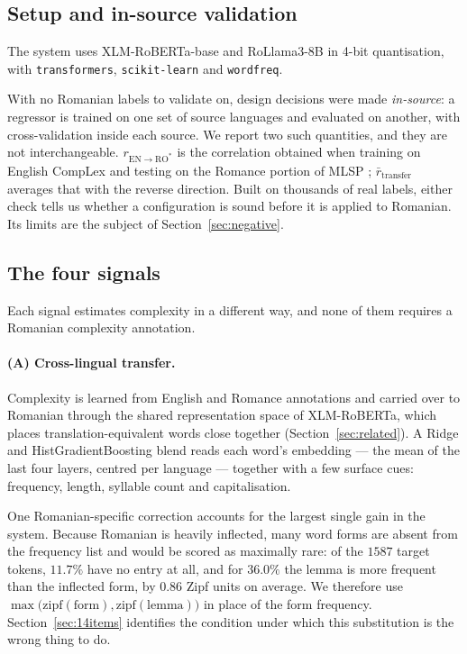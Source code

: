 \subsection{Setup and in-source validation}

The system uses XLM-RoBERTa-base \citep{conneau2020xlmr} and RoLlama3-8B
\citep{masala-etal-2024-vorbesti} in 4-bit quantisation, with
\texttt{transformers}, \texttt{scikit-learn} and \texttt{wordfreq}.

With no Romanian labels to validate on, design decisions were made
\emph{in-source}: a regressor is trained on one set of source languages
and evaluated on another, with cross-validation inside each source. We
report two such quantities, and they are not interchangeable.
$r_{\mathrm{EN}\rightarrow\mathrm{RO}^{*}}$ is the correlation obtained
when training on English CompLex \citep{shardlow-etal-2021-semeval} and
testing on the Romance portion of MLSP \citep{shardlow-etal-2024-bea};
$\bar{r}_{\mathrm{transfer}}$ averages that with the reverse direction.
Built on thousands of real labels, either check tells us whether a
configuration is sound before it is applied to Romanian. Its limits are
the subject of Section~\ref{sec:negative}.

\subsection{The four signals}

Each signal estimates complexity in a different way, and none of them
requires a Romanian complexity annotation.

\paragraph{(A) Cross-lingual transfer.}
Complexity is learned from English and Romance annotations
\citep{shardlow-etal-2021-semeval, shardlow-etal-2024-bea} and carried
over to Romanian through the shared representation space of
XLM-RoBERTa, which places translation-equivalent words close together
(Section~\ref{sec:related}). A Ridge and HistGradientBoosting blend
reads each word's embedding --- the mean of the last four layers,
centred per language --- together with a few surface cues: frequency,
length, syllable count and capitalisation.

One Romanian-specific correction accounts for the largest single gain
in the system. Because Romanian is heavily inflected, many word forms
are absent from the frequency list and would be scored as maximally
rare: of the $1587$ target tokens, $11.7\%$ have no entry at all, and
for $36.0\%$ the lemma is more frequent than the inflected form, by
$0.86$ Zipf units on average. We therefore use
$\max\bigl(\mathrm{zipf}(\mathrm{form}), \mathrm{zipf}(\mathrm{lemma})\bigr)$
in place of the form frequency. Section~\ref{sec:14items} identifies the
condition under which this substitution is the wrong thing to do.

